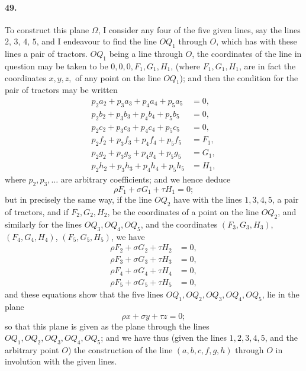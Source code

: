 \documentclass[11pt,a4paper]{article}
\begin{document}
\paragraph{49.}
To construct this plane $\Omega$, I consider any four of the five given lines, say
the lines $2$, $3$, $4$, $5$, and I endeavour to find the line $OQ_1$ through $O$, which has
with these lines a pair of tractors. $OQ_1$ being a line through $O$, the coordinates of
the line in question may be taken to be $0, 0, 0, F_1, G_1, H_1$, (where $F_1, G_1, H_1$, are in fact the
coordinates $x, y, z,$ of any point on the line $OQ_1$); and then the condition for the
pair of tractors may be written
\begin{align*}
p_2 a_2 + p_3 a_3 + p_4 a_4 + p_5 a_5 &= 0, \\
p_2 b_2 + p_3 b_3 + p_4 b_4 + p_5 b_5 &= 0, \\
p_2 c_2 + p_3 c_3 + p_4 c_4 + p_5 c_5 &= 0, \\
p_2 f_2 + p_3 f_3 + p_4 f_4 + p_5 f_5 &= F_1, \\
p_2 g_2 + p_3 g_3 + p_4 g_4 + p_5 g_5 &= G_1, \\
p_2 h_2 + p_3 h_3 + p_4 h_4 + p_5 h_5 &= H_1,
\end{align*}
where $p_2, p_3, \ldots$ are arbitrary coefficients; and we hence deduce
\[
\rho F_1 + \sigma G_1 + \tau H_1 = 0;
\]
but in precisely the same way, if the line $OQ_2$ have with the lines $1, 3, 4, 5$, a pair
of tractors, and if $F_2, G_2, H_2$, be the coordinates of a point on the line $OQ_2$, and
similarly for the lines $OQ_3, OQ_4, OQ_5$, and the coordinates $(F_3, G_3, H_3)$,
$(F_4, G_4, H_4)$, $(F_5, G_5, H_5)$, we have
\begin{align*}
\rho F_2 + \sigma G_2 + \tau H_2 &= 0, \\
\rho F_3 + \sigma G_3 + \tau H_3 &= 0, \\
\rho F_4 + \sigma G_4 + \tau H_4 &= 0, \\
\rho F_5 + \sigma G_5 + \tau H_5 &= 0,
\end{align*}
and these equations show that the five lines $OQ_1, OQ_2, OQ_3, OQ_4, OQ_5$, lie in the plane
\[
\rho x + \sigma y + \tau z = 0;
\]
so that this plane is given as the plane through the lines $OQ_1, OQ_2, OQ_3, OQ_4, OQ_5$;
and we have thus (given the lines $1, 2, 3, 4, 5$, and the arbitrary point $O$) the
construction of the line $(a,b,c,f,g,h)$ through $O$ in involution with the given lines.
\end{document}
